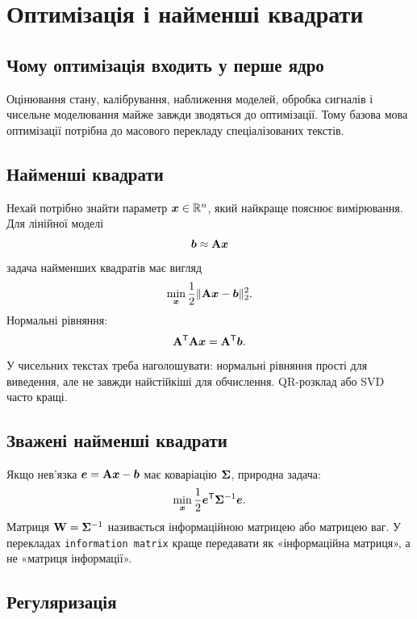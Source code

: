 \chapter{Оптимізація і найменші квадрати}

\section{Чому оптимізація входить у перше ядро}

Оцінювання стану, калібрування, наближення моделей, обробка сигналів і чисельне моделювання майже завжди зводяться до оптимізації. Тому базова мова оптимізації потрібна до масового перекладу спеціалізованих текстів.

\section{Найменші квадрати}

Нехай потрібно знайти параметр $\bm{x}\in\mathbb{R}^n$, який найкраще пояснює вимірювання. Для лінійної моделі
\begin{equation}
    \bm{b}\approx \mathbf{A}\bm{x}
\end{equation}
задача найменших квадратів має вигляд
\begin{equation}
    \min_{\bm{x}} \frac{1}{2}\|\mathbf{A}\bm{x}-\bm{b}\|_2^2.
\end{equation}
Нормальні рівняння:
\begin{equation}
    \mathbf{A}^{\mathsf{T}}\mathbf{A}\bm{x}=\mathbf{A}^{\mathsf{T}}\bm{b}.
\end{equation}
У чисельних текстах треба наголошувати: нормальні рівняння прості для виведення, але не завжди найстійкіші для обчислення. QR-розклад або SVD часто кращі.

\section{Зважені найменші квадрати}

Якщо нев'язка $\bm{e}=\mathbf{A}\bm{x}-\bm{b}$ має коваріацію $\mathbf{\Sigma}$, природна задача:
\begin{equation}
    \min_{\bm{x}} \frac{1}{2}\bm{e}^{\mathsf{T}} \mathbf{\Sigma}^{-1}\bm{e}.
\end{equation}
Матриця $\mathbf{W}=\mathbf{\Sigma}^{-1}$ називається інформаційною матрицею або матрицею ваг. У перекладах \texttt{information matrix} краще передавати як «інформаційна матриця», а не «матриця інформації».

\section{Регуляризація}

